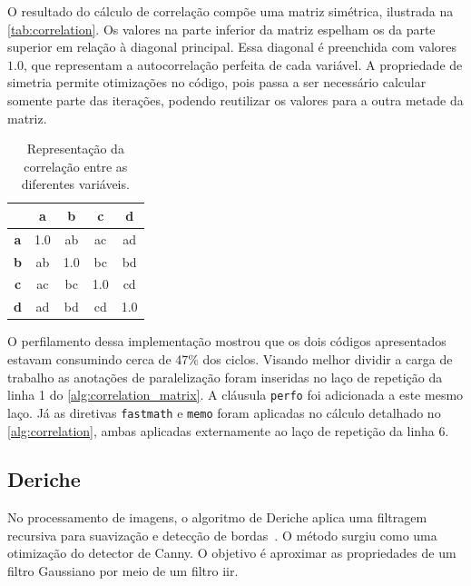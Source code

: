 O resultado do cálculo de correlação compõe uma matriz simétrica, ilustrada na \autoref{tab:correlation}. Os valores na parte inferior da matriz espelham os da parte superior em relação à diagonal principal. Essa diagonal é preenchida com valores $1.0$, que representam a autocorrelação perfeita de cada variável. A propriedade de simetria permite otimizações no código, pois passa a ser necessário calcular somente parte das iterações, podendo reutilizar os valores para a outra metade da matriz.

\begin{table}[htb]
    \caption{Representação da correlação entre as diferentes variáveis.}
    \centering
    \begin{tabular}{|c|c|c|c|c|}
        \hline
                   & \textbf{a} & \textbf{b} & \textbf{c} & \textbf{d} \\
        \hline
        \textbf{a} & 1.0        & ab         & ac         & ad         \\
        \hline
        \textbf{b} & ab         & 1.0        & bc         & bd         \\
        \hline
        \textbf{c} & ac         & bc         & 1.0        & cd         \\
        \hline
        \textbf{d} & ad         & bd         & cd         & 1.0        \\
        \hline
    \end{tabular}
    \label{tab:correlation}
\end{table}

O perfilamento dessa implementação mostrou que os dois códigos apresentados estavam consumindo cerca de 47\% dos ciclos. Visando melhor dividir a carga de trabalho as anotações de paralelização foram inseridas no laço de repetição da linha 1 do \autoref{alg:correlation_matrix}. A cláusula \texttt{perfo} foi adicionada a este mesmo laço. Já as diretivas \texttt{fastmath} e \texttt{memo} foram aplicadas no cálculo detalhado no \autoref{alg:correlation}, ambas aplicadas externamente ao laço de repetição da linha 6.

\subsection{Deriche}\label{subsec:deriche}

No processamento de imagens, o algoritmo de Deriche aplica uma filtragem recursiva para suavização e detecção de bordas~\cite{deriche1987}. O método surgiu como uma otimização do detector de Canny. O objetivo é aproximar as propriedades de um filtro Gaussiano por meio de um filtro \gls{iir}.

